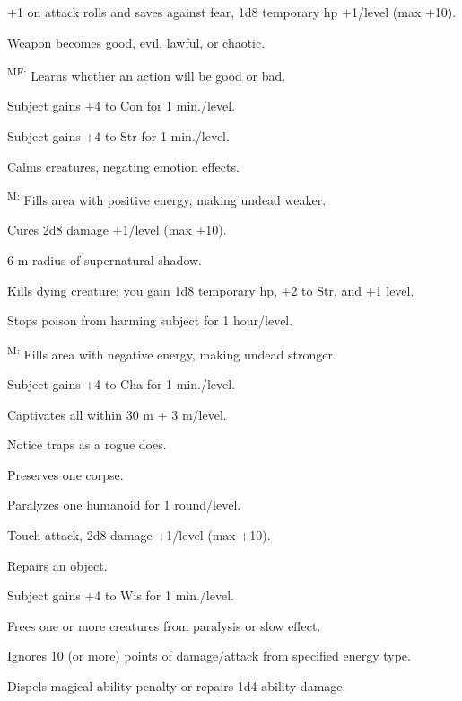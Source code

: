 +1 on attack rolls and saves against fear, 1d8 temporary hp +1/level (max +10).

 Weapon becomes good, evil, lawful, or chaotic.

\textsuperscript{MF:} Learns whether an action will be good or bad.

 Subject gains +4 to Con for 1 min./level.

 Subject gains +4 to Str for 1 min./level.

 Calms creatures, negating emotion effects.

\textsuperscript{M:} Fills area with positive energy, making undead weaker.

 Cures 2d8 damage +1/level (max +10).

 6-m radius of supernatural shadow.

 Kills dying creature; you gain 1d8 temporary hp, +2 to Str, and +1 level.

 Stops poison from harming subject for 1 hour/level.

\textsuperscript{M:} Fills area with negative energy, making undead stronger.

 Subject gains +4 to Cha for 1 min./level.

 Captivates all within 30 m + 3 m/level.

 Notice traps as a rogue does.

 Preserves one corpse.

 Paralyzes one humanoid for 1 round/level.

 Touch attack, 2d8 damage +1/level (max +10).

 Repairs an object.

 Subject gains +4 to Wis for 1 min./level.

 Frees one or more creatures from paralysis or slow effect.

 Ignores 10 (or more) points of damage/attack from specified energy type.

 Dispels magical ability penalty or repairs 1d4 ability damage.

